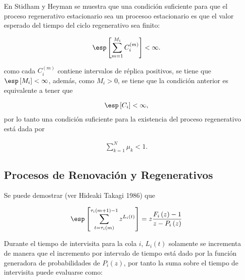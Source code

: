 \begin{Note}\label{Cita1.Stidham}
En Stidham\cite{Stidham} y Heyman  se muestra que una condici\'on suficiente para que el proceso regenerativo 
estacionario sea un procesoo estacionario es que el valor esperado del tiempo del ciclo regenerativo sea finito:

\begin{eqnarray*}
\esp\left[\sum_{m=1}^{M_{i}}C_{i}^{(m)}\right]<\infty.
\end{eqnarray*}

como cada $C_{i}^{(m)}$ contiene intervalos de r\'eplica positivos, se tiene que $\esp\left[M_{i}\right]<\infty$, adem\'as, como $M_{i}>0$, se tiene que la condici\'on anterior es equivalente a tener que 

\begin{eqnarray*}
\esp\left[C_{i}\right]<\infty,
\end{eqnarray*}
por lo tanto una condici\'on suficiente para la existencia del proceso regenerativo est\'a dada por

\begin{eqnarray*}
\sum_{k=1}^{N}\mu_{k}<1.
\end{eqnarray*}

{}
\end{Note}

\subsection{Procesos de Renovaci\'on y Regenerativos}



Se puede demostrar (ver Hideaki Takagi 1986) que

\begin{eqnarray*}
\esp\left[\sum_{t=\tau_{i}\left(m\right)}^{\tau_{i}\left(m+1\right)-1}z^{L_{i}\left(t\right)}\right]=z\frac{F_{i}\left(z\right)-1}{z-P_{i}\left(z\right)}
\end{eqnarray*}

Durante el tiempo de intervisita para la cola $i$, $L_{i}\left(t\right)$ solamente se incrementa de manera que el incremento por intervalo de tiempo est\'a dado por la funci\'on generadora de probabilidades de $P_{i}\left(z\right)$, por tanto la suma sobre el tiempo de intervisita puede evaluarse como:

